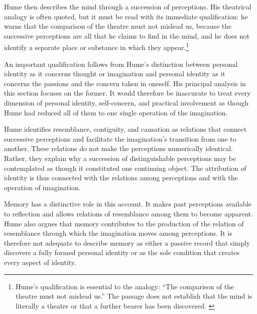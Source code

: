 \label{para:VS.B01.P01.C08.S09.SS07.P002}

Hume then describes the mind through a succession
of perceptions. His theatrical analogy is often
quoted, but it must be read with its immediate
qualification: he warns that the comparison of
the theatre must not mislead us, because the
successive perceptions are all that he claims
to find in the mind, and he does not identify
a separate place or substance in which they
appear.\footnote{Hume's qualification is essential to the analogy: ``The comparison of the theatre must not mislead us.'' The passage does not establish that the mind is literally a theatre or that a further bearer has been discovered. \cite[1.4.6.4, SBN 252--253]{HumeTreatise}}

\label{para:VS.B01.P01.C08.S09.SS07.P003}

An important qualification follows from Hume's
distinction between personal identity as it concerns
thought or imagination and personal identity as
it concerns the passions and the concern taken
in oneself. His principal analysis in this section
focuses on the former. It would therefore be
inaccurate to treat every dimension of personal
identity, self-concern, and practical involvement
as though Hume had reduced all of them to one
single operation of the imagination.
\cite[1.4.6.5, SBN 253]{HumeTreatise}

\label{para:VS.B01.P01.C08.S09.SS07.P004}

Hume identifies resemblance, contiguity, and causation
as relations that connect successive perceptions
and facilitate the imagination's transition from
one to another. These relations do not make the
perceptions numerically identical. Rather, they
explain why a succession of distinguishable
perceptions may be contemplated as though it
constituted one continuing object. The attribution
of identity is thus connected with the relations
among perceptions and with the operation of
imagination.
\cite[1.4.6.6--7, SBN 253--255]{HumeTreatise}

\label{para:VS.B01.P01.C08.S09.SS07.P005}

Memory has a distinctive role in this account.
It makes past perceptions available to reflection
and allows relations of resemblance among them
to become apparent. Hume also argues that memory
contributes to the production of the relation
of resemblance through which the imagination
moves among perceptions. It is therefore not
adequate to describe memory as either a passive
record that simply discovers a fully formed
personal identity or as the sole condition that
creates every aspect of identity.
\cite[1.4.6.16--18, SBN 259--261]{HumeTreatise}

